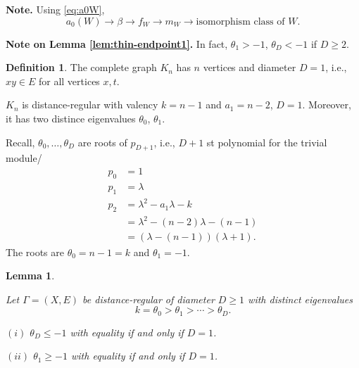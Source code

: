 \documentclass[
]{book}
\newtheorem{lemma}{Lemma}[chapter]
\theoremstyle{definition}
\newtheorem{definition}{Definition}[chapter]
\theoremstyle{definition}
\theoremstyle{definition}
\theoremstyle{definition}
\theoremstyle{remark}
\begin{document}
\textbf{Note.}
Using \eqref{eq:a0W},
\[a_0(W) \to \beta \to f_W \to m_W \to \text{isomorphism class of $W$}.\]

\textbf{Note on Lemma \ref{lem:thin-endpoint1}.}
In fact, \(\theta_1 > -1\), \(\theta_D < -1\) if \(D\geq 2\).

\begin{definition}
\protect\hypertarget{def:complete-graph}{}\label{def:complete-graph}The complete graph  \(K_n\) has \(n\) vertices and diameter \(D = 1\), i.e., \(xy\in E\) for all vertices \(x,t\).
\end{definition}

\(K_n\) is distance-regular with valency \(k = n-1\) and \(a_1 = n-2\), \(D = 1\).
Moreover, it has two distince eigenvalues \(\theta_0\), \(\theta_1\).

Recall, \(\theta_0, \ldots, \theta_D\) are roots of \(p_{D+1}\), i.e., \(D+1\) st polynomial for the trivial module/
\begin{align}
p_0 & = 1\\
p_1 & = \lambda\\
p_2 & = \lambda^2 - a_1\lambda - k\\
& = \lambda^2 - (n-2)\lambda - (n-1)\\
& = (\lambda - (n-1))(\lambda +1).
\end{align}
The roots are \(\theta_0 = n-1 = k\) and \(\theta_1 = -1\).

\begin{lemma}
\protect\hypertarget{lem:sedond-and-largest-ev}{}\label{lem:sedond-and-largest-ev}

Let \(\Gamma = (X, E)\) be distance-regular of diameter \(D\geq 1\) with distinct eigenvalues
\[k = \theta_0 > \theta_1 > \cdots > \theta_D.\]

\((i)\) \(\theta_D\leq -1\) with equality if and only if \(D = 1\).

\((ii)\) \(\theta_1 \geq -1\) with equality if and only if \(D=1\).

\end{lemma}
\end{document}
